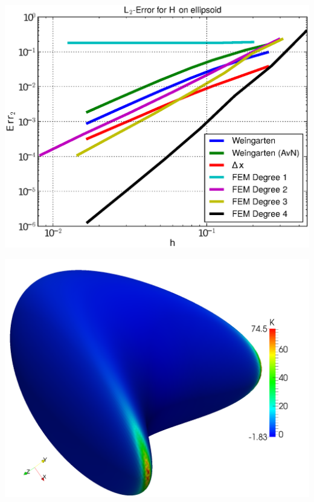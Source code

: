 \documentclass{beamer}
\begin{document}
\begin{frame}
\begin{overprint}
\begin{minipage}[t]{0.49\textwidth}
            \centering\includegraphics[width=\textwidth]{bilder/Curvature/heineC/ErrHL2_7.eps}
          \end{minipage}
          \begin{minipage}[t]{0.49\textwidth}
              \centering\includegraphics[width=\textwidth]{bilder/Curvature/heineB/K250k.png}
          \end{minipage}\hfill
          \begin{minipage}[t]{0.49\textwidth}

\end{minipage}
\end{overprint}
\end{frame}
\end{document}
